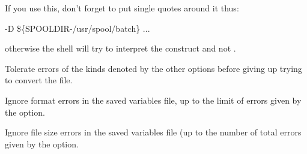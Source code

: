 If you use this, don't forget to put single quotes around it thus:

\begin{expara}

\XbCvlistName{} -D
{\textquotesingle}\$\{SPOOLDIR-/usr/spool/batch\}{\textquotesingle}
...

\end{expara}

otherwise the shell will try to interpret the \exampletext{\$} construct and not \PrXbCvlist{}.


Tolerate  errors of the kinds denoted by the other options before giving up trying to convert the file.


Ignore format errors in the saved variables file, up to the limit of errors given by the  option.


Ignore file size errors in the saved variables file (up to the number of total errors given by the  option.


